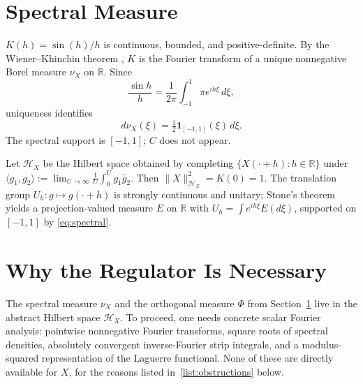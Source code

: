 \documentclass[12pt]{amsart}
\theoremstyle{remark}
\begin{document}
\section{Spectral Measure}\label{sec:spectral}

$K(h)=\sin(h)/h$ is continuous, bounded, and positive-definite.
By the Wiener--Khinchin theorem \cite{Wiener}, $K$ is the Fourier
transform of a unique nonnegative Borel measure $\nu_X$ on $\mathbb{R}$.
Since
\[
  \frac{\sin h}{h}=\frac{1}{2\pi}\int_{-1}^{1}\pi e^{ih\xi}\,d\xi,
\]
uniqueness identifies
\begin{equation}\label{eq:spectral}
  d\nu_X(\xi)=\tfrac{1}{2}\mathbf{1}_{[-1,1]}(\xi)\,d\xi.
\end{equation}
The spectral support is $[-1,1]$; $C$ does not appear.

Let $\mathcal{H}_X$ be the Hilbert space obtained by completing
$\{X(\cdot+h):h\in\mathbb{R}\}$ under
$\langle g_1,g_2\rangle:=\lim_{U\to\infty}\frac{1}{U}\int_0^U g_1\bar g_2$.
Then $\|X\|_{\mathcal{H}_X}^2=K(0)=1$.  The translation group
$U_h:g\mapsto g(\cdot+h)$ is strongly continuous and unitary; Stone's
theorem yields a projection-valued measure $E$ on $\mathbb{R}$ with
$U_h=\int e^{ih\xi}E(d\xi)$, supported on $[-1,1]$ by \eqref{eq:spectral}.

\section{Why the Regulator Is Necessary}
\label{sec:regulator}

The spectral measure $\nu_X$ and the orthogonal measure $\Phi$ from
Section~\ref{sec:spectral} live in the abstract Hilbert space
$\mathcal{H}_X$.  To proceed, one needs concrete scalar Fourier
analysis: pointwise nonnegative Fourier transforms, square roots of
spectral densities, absolutely convergent inverse-Fourier strip
integrals, and a modulus-squared representation of the Laguerre
functional.  None of these are directly available for $X$, for the
reasons listed in~\eqref{list:obstructions} below.
\end{document}
